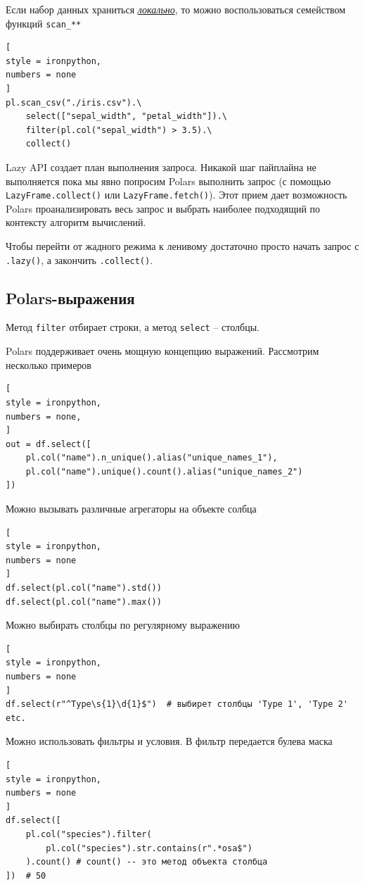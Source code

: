 \documentclass[%
	11pt,
	a4paper,
	utf8,
		]{article}
\begin{document}
Если набор данных храниться \underline{\itshape локально}, то можно воспользоваться семейством функций \texttt{scan\_**}
\begin{lstlisting}[
style = ironpython,
numbers = none
]
pl.scan_csv("./iris.csv").\
    select(["sepal_width", "petal_width"]).\
    filter(pl.col("sepal_width") > 3.5).\
    collect()
\end{lstlisting}

Lazy API создает план выполнения запроса. Никакой шаг пайплайна не выполняется пока мы явно попросим Polars выполнить запрос (с помощью \verb*|LazyFrame.collect()| или \verb*|LazyFrame.fetch()|). Этот прием дает возможность Polars проанализировать весь запрос и выбрать наиболее подходящий по контексту алгоритм вычислений.


Чтобы перейти от жадного режима к ленивому достаточно просто начать запрос с \verb*|.lazy()|, а закончить \verb*|.collect()|.

\subsection{Polars-выражения}

Метод \texttt{filter} отбирает строки, а метод \texttt{select} -- столбцы.

Polars поддерживает очень мощную концепцию выражений. Рассмотрим несколько примеров
\begin{lstlisting}[
style = ironpython,
numbers = none,
]
out = df.select([
    pl.col("name").n_unique().alias("unique_names_1"),
    pl.col("name").unique().count().alias("unique_names_2")
])
\end{lstlisting}

Можно вызывать различные агрегаторы на объекте солбца
\begin{lstlisting}[
style = ironpython,
numbers = none
]
df.select(pl.col("name").std())
df.select(pl.col("name").max())
\end{lstlisting}

Можно выбирать столбцы по регулярному выражению
\begin{lstlisting}[
style = ironpython,
numbers = none
]
df.select(r"^Type\s{1}\d{1}$")  # выбирет столбцы 'Type 1', 'Type 2' etc.
\end{lstlisting}

Можно использовать фильтры и условия. В фильтр передается булева маска
\begin{lstlisting}[
style = ironpython,
numbers = none
]
df.select([
    pl.col("species").filter(
        pl.col("species").str.contains(r".*osa$")
    ).count() # count() -- это метод объекта столбца
])  # 50
\end{lstlisting}
\end{document}

